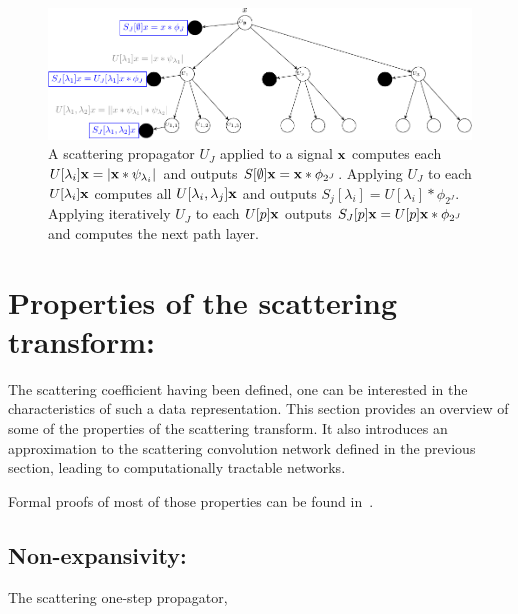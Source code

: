 \documentclass[a4paper,11pt]{report}
\begin{document}
      \begin{figure}[h]
				\begin{center}
					\includegraphics[width=5in]{ST_crop.pdf}
					\caption[The scattering convolutional network architecture]{\centering A scattering propagator $U_{J}$ applied to a signal ${\bf x}$ computes each $U[\lambda_{i}]{\bf x} = |{\bf x} \ast \psi_{\lambda_{i}}|$ and outputs $S[\emptyset]{\bf x}= {\bf x} \ast \phi_{2^{J}}$. Applying $U_{J}$ to each  $U[\lambda_{i}]{\bf x}$ computes all $U[\lambda_{i},\lambda_{j}]{\bf x}$ and outputs $S_{j}[\lambda_{i}] =  U[\lambda_{i}] \ast \phi_{2^{J}}$. Applying iteratively $U_{J}$ to each $U[p]{\bf x}$ outputs $S_{J}[p]{\bf x} = U[p]{\bf x} \ast \phi_{2^{J}}$ and computes the next path layer.}
					\label{fig:SCN}
				\end{center}	
      \end{figure}
      
      
      
	\section{Properties of the scattering transform:}
		\label{sec:ST/Pties}
		
		The scattering coefficient having been defined, one can be interested in the characteristics of such a data representation. This section provides an overview of some of the properties of the scattering transform. It also introduces an approximation to the scattering convolution network defined in the previous section, leading to computationally tractable networks.\\
		
		\begin{note}
		  Formal proofs of most of those properties can be found in~\citep{mallat2012gis}.
		\end{note}

		\subsection{Non-expansivity:}
			\label{subsec:ST/Pties/Non-expansivity}
			The scattering one-step propagator,
			
\end{document}
